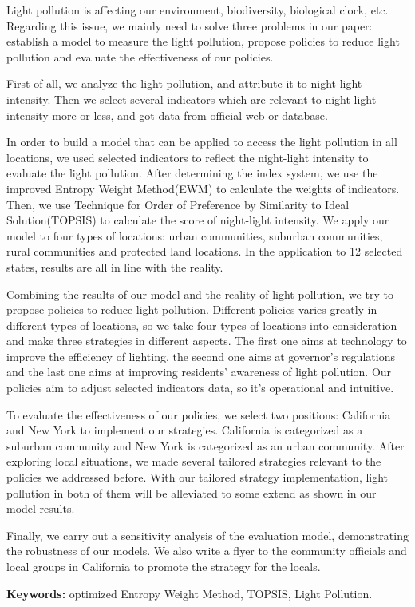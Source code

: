 \MinParskip{}

Light pollution is affecting our environment, biodiversity, biological clock, etc. Regarding this issue, we mainly need to solve three problems in our paper: establish a model to measure the light pollution, propose policies to reduce light pollution and evaluate the effectiveness of our policies. 

First of all, we analyze the light pollution, and attribute it to night-light intensity. Then we select several indicators which are relevant to night-light intensity more or less, and got data from official web or database.

In order to build a model that can be applied to access the light pollution in all locations, we used selected indicators to reflect the night-light intensity to evaluate the light pollution. After determining the index system, we use the improved Entropy Weight Method(EWM) to calculate the weights of indicators. Then, we use Technique for Order of Preference by Similarity to Ideal Solution(TOPSIS) to calculate the score of night-light intensity. We apply our model to four types of locations: urban communities, suburban communities, rural communities and protected land locations. In the application to 12 selected states, results are all in line with the reality.

Combining the results of our model and the reality of light pollution, we try to propose policies to reduce light pollution. Different policies varies greatly in different types of locations, so we take four types of locations into consideration and make three strategies in different aspects. The first one aims at technology to improve the efficiency of lighting, the second one aims at governor’s regulations and the last one aims at improving residents’ awareness of light pollution. Our policies aim to adjust selected indicators data, so it’s operational and intuitive. 

To evaluate the effectiveness of our policies, we select two positions: California and New York to implement our strategies. California is categorized as a suburban community and New York is categorized as an urban community. After exploring local situations, we made several tailored strategies relevant to the policies we addressed before. With our tailored strategy implementation, light pollution in both of them will be alleviated to some extend as shown in our model results.

Finally, we carry out a sensitivity analysis of the evaluation model, demonstrating the robustness of our models. We also write a flyer to the community officials and local groups in California to promote the strategy for the locals.


\textbf{Keywords:} optimized Entropy Weight Method, TOPSIS, Light Pollution.